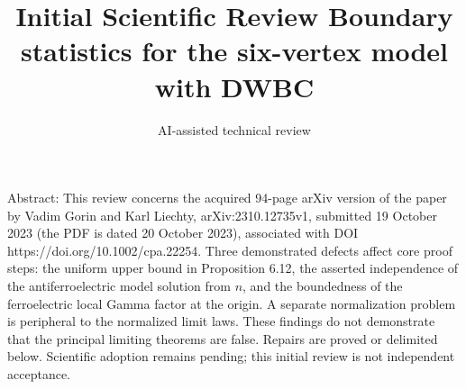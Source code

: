 \documentclass[10pt]{article}
\title{Initial Scientific Review
Boundary statistics for the six-vertex model with DWBC}
\author{AI-assisted technical review}
\date{}
\begin{document}
\maketitle
Abstract: This review concerns the acquired 94-page arXiv version of the paper by Vadim Gorin and Karl Liechty, arXiv:2310.12735v1, submitted 19 October 2023 (the PDF is dated 20 October 2023), associated with DOI https://doi.org/10.1002/cpa.22254. Three demonstrated defects affect core proof steps: the uniform upper bound in Proposition 6.12, the asserted independence of the antiferroelectric model solution from \(n\), and the boundedness of the ferroelectric local Gamma factor at the origin. A separate normalization problem is peripheral to the normalized limit laws. These findings do not demonstrate that the principal limiting theorems are false. Repairs are proved or delimited below. Scientific adoption remains pending; this initial review is not independent acceptance.\par
\end{document}
